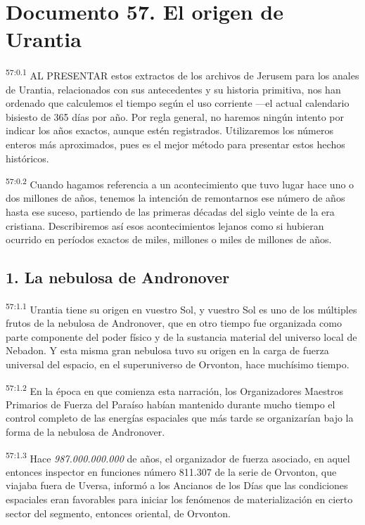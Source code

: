 \chapter{Documento 57. El origen de Urantia}
\par
\textsuperscript{57:0.1} AL PRESENTAR estos extractos de los archivos de Jerusem para los anales de Urantia, relacionados con sus antecedentes y su historia primitiva, nos han ordenado que calculemos el tiempo según el uso corriente ---el actual calendario bisiesto de 365{\textonequarter} días por año. Por regla general, no haremos ningún intento por indicar los años exactos, aunque estén registrados. Utilizaremos los números enteros más aproximados, pues es el mejor método para presentar estos hechos históricos.

\par
\textsuperscript{57:0.2} Cuando hagamos referencia a un acontecimiento que tuvo lugar hace uno o dos millones de años, tenemos la intención de remontarnos ese número de años hasta ese suceso, partiendo de las primeras décadas del siglo veinte de la era cristiana. Describiremos así esos acontecimientos lejanos como si hubieran ocurrido en períodos exactos de miles, millones o miles de millones de años.

\section*{1. La nebulosa de Andronover}
\par
\textsuperscript{57:1.1} Urantia tiene su origen en vuestro Sol, y vuestro Sol es uno de los múltiples frutos de la nebulosa de Andronover, que en otro tiempo fue organizada como parte componente del poder físico y de la sustancia material del universo local de Nebadon. Y esta misma gran nebulosa tuvo su origen en la carga de fuerza universal del espacio, en el superuniverso de Orvonton, hace muchísimo tiempo.

\par
\textsuperscript{57:1.2} En la época en que comienza esta narración, los Organizadores Maestros Primarios de Fuerza del Paraíso habían mantenido durante mucho tiempo el control completo de las energías espaciales que más tarde se organizarían bajo la forma de la nebulosa de Andronover.

\par
\textsuperscript{57:1.3} Hace \textit{987.000.000.000} de años, el organizador de fuerza asociado, en aquel entonces inspector en funciones número 811.307 de la serie de Orvonton, que viajaba fuera de Uversa, informó a los Ancianos de los Días que las condiciones espaciales eran favorables para iniciar los fenómenos de materialización en cierto sector del segmento, entonces oriental, de Orvonton.

